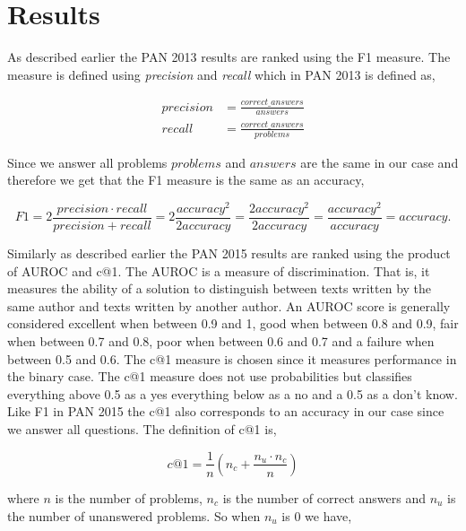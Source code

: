 \section{Results} \label{sec:results}
As described earlier the PAN 2013 results are ranked using the F1 measure. The
measure is defined using \textit{precision} and \textit{recall} which in PAN
2013 is defined as,

\begin{align}
    precision &=  \frac{correct\_answers}{answers} \\[1em]
    recall &= \frac{correct\_answers}{problems}
\end{align}

Since we answer all problems $problems$ and $answers$ are the same in our case
and therefore we get that the F1 measure is the same as an accuracy,

\begin{equation}
    F1 = 2 \frac{precision \cdot recall}{precision + recall}
        = 2 \frac{accuracy^2}{2accuracy}
        = \frac{2accuracy^2}{2accuracy}
        = \frac{accuracy^2}{accuracy}
        = accuracy.
\end{equation}

Similarly as described earlier the PAN 2015 results are ranked using the product
of \gls{AUROC} and c@1. The \gls{AUROC} is a measure of discrimination. That
is, it measures the ability of a solution to distinguish between texts written
by the same author and texts written by another author. An \gls{AUROC} score is
generally considered excellent when between 0.9 and 1, good when between 0.8
and 0.9, fair when between 0.7 and 0.8, poor when between 0.6 and 0.7 and a
failure when between 0.5 and 0.6. The c@1 measure is chosen since it measures
performance in the binary case. The c@1 measure does not use probabilities but
classifies everything above 0.5 as a yes everything below as a no and a 0.5 as a
don't know. Like F1 in PAN 2015 the c@1 also corresponds to an accuracy in our
case since we answer all questions. The definition of c@1 is,

\begin{equation}
    c@1 = \frac{1}{n} \left(n_c + \frac{n_u \cdot n_c}{n}\right)
\end{equation}

where $n$ is the number of problems, $n_c$ is the number of correct answers and
$n_u$ is the number of unanswered problems. So when $n_u$ is 0 we have,

